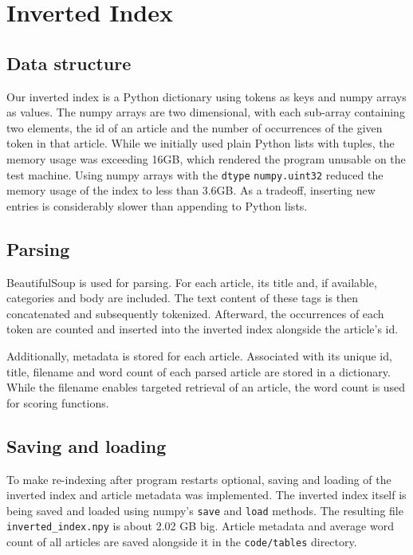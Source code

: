 \section{Inverted Index}
\label{sec:index}

\subsection{Data structure}

Our inverted index is a Python dictionary using tokens as keys and numpy arrays as values.
The numpy arrays are two dimensional, with each sub-array containing two elements, the id of an article and the number of occurrences of the given token in that article.
While we initially used plain Python lists with tuples, the memory usage was exceeding 16GB, which rendered the program unusable on the test machine.
Using numpy arrays with the \verb|dtype| \verb|numpy.uint32| reduced the memory usage of the index to less than 3.6GB.
As a tradeoff, inserting new entries is considerably slower than appending to Python lists.

\subsection{Parsing}

BeautifulSoup is used for parsing.
For each article, its title and, if available, categories and body are included.
The text content of these tags is then concatenated and subsequently tokenized.
Afterward, the occurrences of each token are counted and inserted into the inverted index alongside the article's id.

Additionally, metadata is stored for each article.
Associated with its unique id, title, filename and word count of each parsed article are stored in a dictionary.
While the filename enables targeted retrieval of an article, the word count is used for scoring functions.

\subsection{Saving and loading}

To make re-indexing after program restarts optional, saving and loading of the inverted index and article metadata was implemented.
The inverted index itself is being saved and loaded using numpy's \verb|save| and \verb|load| methods.
The resulting file \verb|inverted_index.npy| is about 2.02 GB big.
Article metadata and average word count of all articles are saved alongside it in the \verb|code/tables| directory.
